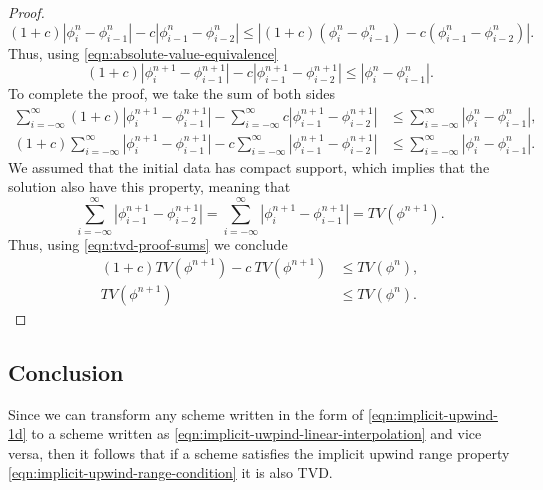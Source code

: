 \documentclass[../thesis.tex]{subfiles}
\begin{document}
\begin{theorem}
\begin{proof}
\begin{equation}
    (1+c)|\phi_{i}^{n} - \phi_{i-1}^{n}|
    - c |\phi_{i-1}^{n} - \phi_{i-2}^{n}|
    \leq
    |(1+c)\left( \phi_{i}^{n} - \phi_{i-1}^{n} \right)
    - c \left( \phi_{i-1}^{n} - \phi_{i-2}^{n} \right)|.
\end{equation}
Thus, using \eqref{eqn:absolute-value-equivalence}
\begin{equation}
    (1+c)|\phi_{i}^{n+1} - \phi_{i-1}^{n+1}|
    - c |\phi_{i-1}^{n+1} - \phi_{i-2}^{n+1}|
    \leq
    |\phi_{i}^{n} - \phi_{i-1}^{n}|.
\end{equation}
To complete the proof, we take the sum of both sides
\begin{equation}\label{eqn:tvd-proof-sums}
    \begin{split}
        \sum_{i=-\infty}^{\infty}(1+c)|\phi_{i}^{n+1} - \phi_{i-1}^{n+1}|
        - \sum_{i=-\infty}^{\infty} c |\phi_{i-1}^{n+1} - \phi_{i-2}^{n+1}|
        &\leq
        \sum_{i=-\infty}^{\infty}|\phi_{i}^{n} - \phi_{i-1}^{n}|,
        \\
        (1+c)\sum_{i=-\infty}^{\infty}|\phi_{i}^{n+1} - \phi_{i-1}^{n+1}|
        - c \sum_{i=-\infty}^{\infty} |\phi_{i-1}^{n+1} - \phi_{i-2}^{n+1}|
        &\leq
        \sum_{i=-\infty}^{\infty}|\phi_{i}^{n} - \phi_{i-1}^{n}|.
    \end{split}
\end{equation}
We assumed that the initial data has compact support, which implies that the solution also have this property, meaning that
\begin{equation}
    \sum_{i=-\infty}^{\infty} |\phi_{i-1}^{n+1} - \phi_{i-2}^{n+1}|
    = \sum_{i=-\infty}^{\infty}|\phi_{i}^{n+1} - \phi_{i-1}^{n+1}|
    =TV(\phi^{n+1}).
\end{equation}
Thus, using \eqref{eqn:tvd-proof-sums} we conclude
\begin{equation}
    \begin{split}
        (1+c)TV(\phi^{n+1}) - c~TV(\phi^{n+1})
        &\leq
        TV(\phi^{n}),
        \\
        TV(\phi^{n+1})
        &\leq
        TV(\phi^{n}).
    \end{split}
\end{equation}
\end{proof}
\end{theorem}
\subsection{Conclusion}
Since we can transform any scheme written in the form of \eqref{eqn:implicit-upwind-1d}
to a scheme written as \eqref{eqn:implicit-uwpind-linear-interpolation} and
vice versa, then it follows that if a scheme satisfies the implicit upwind range property \eqref{eqn:implicit-upwind-range-condition} it is also TVD.
\end{document}
